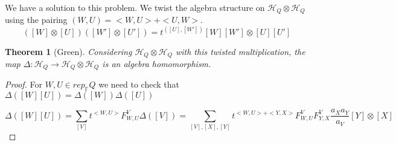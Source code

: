 \documentclass{book}
\newtheorem{theorem}{Theorem}[section]
\begin{document}
We have a solution to this problem. We twist the algebra structure on $\mathcal{H}_Q \otimes \mathcal{H}_Q$ using the pairing $(W,U)=<W,U>+<U,W>$. 
$$([W]\otimes [U])([W']\otimes[U'])=t^{([U],[W'])}[W][W'] \otimes [U][U']$$

\begin{theorem}[Green]
Considering $\mathcal{H}_Q \otimes \mathcal{H}_Q$ with this twisted multiplication, the map $\Delta: \mathcal{H}_Q  \rightarrow \mathcal{H}_Q \otimes \mathcal{H}_Q$ is an algebra homomorphism. 
\end{theorem}

\begin{proof}
For $W,U \in rep_{\mathbb{F}}Q$ we need to check that $\Delta ([W][U])=\Delta ([W])\Delta ([U])$ 

$$\Delta ([W][U]) =  \sum_{[V]} t^{<W,U>} F^V_{W,U} \Delta( [V] ) =  \sum_{[V],[X],[Y]} t^{<W,U>+<Y,X>} F^V_{W,U}  F^V_{Y,X} \frac{a_X a_Y}{a_V} [Y] \otimes [X]$$


\end{proof}
\end{document}
